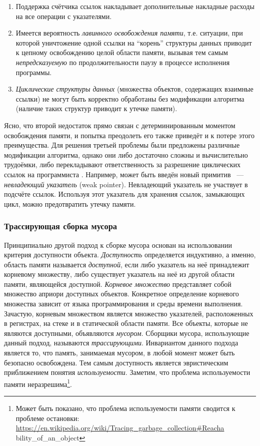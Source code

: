 \begin{enumerate}
\item 
	Поддержка счётчика ссылок накладывает дополнительные накладные расходы на все 
	операции с указателями.
\item 
	Имеется вероятность \emph{лавинного освобождения памяти}, т.е. ситуации, 
	при которой уничтожение одной ссылки на ``корень'' структуры данных приводит 
	к цепному освобождению целой области памяти, вызывая тем самым 
	\emph{непредсказуемую} по продолжительности паузу в процессе исполнения программы.
\item 
	\emph{Циклические структуры данных} (множества объектов, содержащих взаимные ссылки) 
	не могут быть корректно обработаны без модификации алгоритма 
	(наличие таких структур приводит к утечке памяти).
\end{enumerate}

Ясно, что второй недостаток прямо связан с детерминированным моментом освобождения памяти, 
и попытка преодолеть его также приведёт и к потере этого преимущества. 
Для решения третьей проблемы были предложены различные модификации алгоритма, 
однако они либо достаточно сложны и вычислительно трудоёмки, либо перекладывают 
ответственность за разрешение циклических ссылок на программиста \cite{book:jones1996garbage}. 
Например, может быть введён новый примитив ~---~ \emph{невладеющий указатель} (weak pointer). 
Невладеющий указатель не участвует в подсчёте ссылок. 
Используя этот указатель для хранения ссылок, замыкающих цикл, можно предотвратить 
утечку памяти.


\subsubsection{Трассирующая сборка мусора}
Принципиально другой подход к сборке мусора основан на использовании критерия 
доступности объекта. 
\emph{Доступность} определяется индуктивно, а именно, область памяти называется 
\emph{доступной}, если либо указатель на неё принадлежит корневому множеству, 
либо существует указатель на неё из другой области памяти, являющейся доступной. 
\emph{Корневое множество} представляет собой множество априори доступных объектов. 
Конкретное определение корневого множества зависит от языка программирования и среды 
времени выполнения. 
Зачастую, корневым множеством является множество указателей, расположенных в 
регистрах, на стеке и в статической области памяти. 
Все объекты, которые не являются доступными, объявляются \emph{мусором}. 
Сборщики мусора, использующие данный подход, называются \emph{трассирующими}. 
Инвариантом данного подхода является то, что память, занимаемая мусором, 
в любой момент может быть безопасно освобождена. 
Тем самым доступность является эвристическим приближением понятия \emph{используемости}. 
Заметим, что проблема используемости памяти неразрешима\footnote{Может быть показано, что 
проблема используемости памяти сводится к проблеме остановки: \\
\url{https://en.wikipedia.org/wiki/Tracing\_garbage\_collection\#Reacha}\\{bility\_of\_an\_object}}. 

